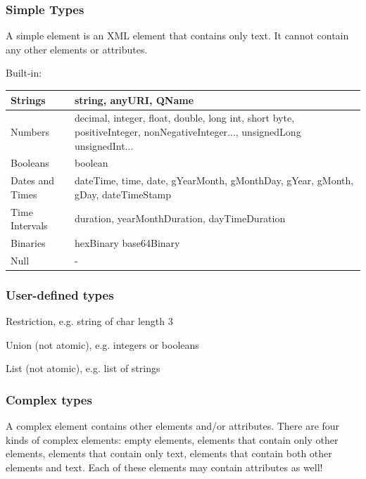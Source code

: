 \documentclass[11pt,oneside,a4paper]{article}
\begin{document}
\subsubsection{Simple Types}

A simple element is an XML element that contains only text. It cannot contain any other elements or attributes.

Built-in:

\begin{tabular}{|l|p{150mm}|}
	\hline 
	Strings & string, anyURI, QName \\ 
	\hline 
	Numbers & decimal, integer, float, double, long int, short byte, positiveInteger, \newline nonNegativeInteger..., unsignedLong unsignedInt... \\ 
	\hline 
	Booleans & boolean \\ 
	\hline 
	Dates and Times & dateTime, time, date, gYearMonth, gMonthDay, gYear, gMonth, gDay, dateTimeStamp \\ 
	\hline 
	Time Intervals & duration, yearMonthDuration, dayTimeDuration \\ 
	\hline 
	Binaries & hexBinary base64Binary \\ 
	\hline 
	Null & - \\ 
	\hline 
\end{tabular} 

\subsubsection{User-defined types}

\begin{compactitem}
	\item Restriction, e.g. string of char length 3
	\item Union (not atomic), e.g. integers or booleans
	\item List (not atomic), e.g. list of strings
\end{compactitem}

\subsubsection{Complex types}

A complex element contains other elements and/or attributes. There are four kinds of complex elements: empty elements, elements that contain only other elements, elements that contain only text, elements that contain both other elements and text. Each of these elements may contain attributes as well!
\end{document}
